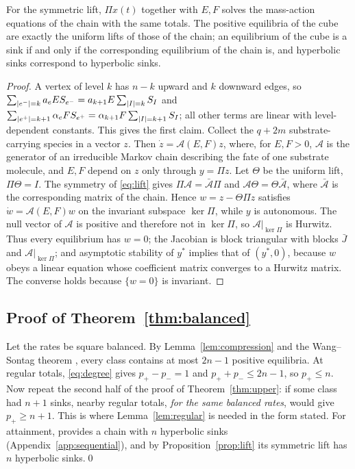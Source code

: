 \begin{proposition}\label{prop:lift}
For the symmetric lift, \(\Pi x(t)\) together with \(E,F\) solves the mass-action equations of
the chain with the same totals. The positive equilibria of the cube are exactly the uniform
lifts of those of the chain; an equilibrium of the cube is a sink if and only if the
corresponding equilibrium of the chain is, and hyperbolic sinks correspond to hyperbolic
sinks.
\end{proposition}
\begin{proof}
A vertex of level \(k\) has \(n-k\) upward and \(k\) downward edges, so
\(\sum_{|e^{-}|=k}a_eES_{e^{-}}=a_{k+1}E\sum_{|I|=k}S_I\) and
\(\sum_{|e^{+}|=k+1}\alpha_eFS_{e^{+}}=\alpha_{k+1}F\sum_{|I|=k+1}S_I\); all other terms are
linear with level-dependent constants. This gives the first claim. Collect the \(q+2m\)
substrate-carrying species in a vector \(z\). Then \(\dot z=\mathcal A(E,F)z\), where, for
\(E,F>0\), \(\mathcal A\) is the generator of an irreducible Markov chain describing the fate of
one substrate molecule, and \(E,F\) depend on \(z\) only through \(y=\Pi z\). Let \(\Theta\) be
the uniform lift, \(\Pi\Theta=I\). The symmetry of \eqref{eq:lift} gives
\(\Pi\mathcal A=\bar{\mathcal A}\Pi\) and \(\mathcal A\Theta=\Theta\bar{\mathcal A}\), where
\(\bar{\mathcal A}\) is the corresponding matrix of the chain. Hence \(w=z-\Theta\Pi z\)
satisfies \(\dot w=\mathcal A(E,F)w\) on the invariant subspace \(\ker\Pi\), while \(y\) is
autonomous. The null vector of \(\mathcal A\) is positive and therefore not in \(\ker\Pi\), so
\(\mathcal A|_{\ker\Pi}\) is Hurwitz. Thus every equilibrium has \(w=0\); the Jacobian is block
triangular with blocks \(\bar J\) and \(\mathcal A|_{\ker\Pi}\); and asymptotic stability of
\(y^*\) implies that of \((y^*,0)\), because \(w\) obeys a linear equation whose coefficient
matrix converges to a Hurwitz matrix. The converse holds because \(\{w=0\}\) is invariant.
\end{proof}

\subsection{Proof of Theorem~\ref{thm:balanced}}
Let the rates be square balanced. By Lemma~\ref{lem:compression} and the Wang--Sontag theorem
\cite[Theorem~3]{WangSontag2008}, every class contains at most \(2n-1\) positive equilibria.
At regular totals, \eqref{eq:degree} gives \(p_+-p_-=1\) and \(p_++p_-\le2n-1\), so
\(p_+\le n\). Now repeat the second half of the proof of Theorem~\ref{thm:upper}: if some class
had \(n+1\) sinks, nearby regular totals, \emph{for the same balanced rates}, would give
\(p_+\ge n+1\). This is where Lemma~\ref{lem:regular} is needed in the form stated. For
attainment, \cite[Theorem~1.1]{Companion} provides a chain with \(n\) hyperbolic sinks
(Appendix~\ref{app:sequential}), and by Proposition~\ref{prop:lift} its symmetric lift has
\(n\) hyperbolic sinks.\qed


